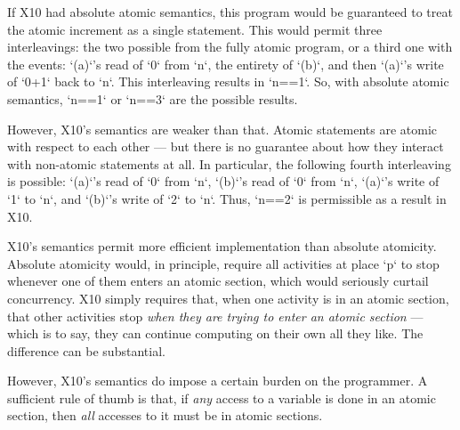 If X10 had absolute atomic semantics, this program would be guaranteed to
treat the atomic increment as a single statement.  This would permit three
interleavings: the two possible from the fully atomic program, or a third one
with the events:  \xcd`(a)`'s read of \xcd`0` from \xcd`n`, the entirety of
\xcd`(b)`, and then \xcd`(a)`'s write of \xcd`0+1` back to \xcd`n`.  This
interleaving results in \xcd`n==1`. So, with absolute atomic semantics,
\xcd`n==1` or \xcd`n==3` are the possible results.

However, X10's semantics are weaker than that.  Atomic statements are atomic
with respect to each other --- but there is no guarantee about how they
interact with non-atomic statements at all.  In particular, the following
fourth interleaving is possible: \xcd`(a)`'s read of \xcd`0` from \xcd`n`, 
\xcd`(b)`'s read of \xcd`0` from \xcd`n`, \xcd`(a)`'s write of \xcd`1` to
\xcd`n`, and \xcd`(b)`'s write of \xcd`2` to \xcd`n`.   Thus, \xcd`n==2` is
permissible as a result in X10.

X10's semantics permit more efficient implementation than absolute atomicity.
Absolute atomicity would, in principle, require all activities at place
\xcd`p` to stop whenever one of them enters an atomic section, which would
seriously curtail concurrency.  X10 simply requires that, when one activity is
in an atomic section, that other activities stop {\em when they are trying to
enter an atomic section} --- which is to say, they can continue computing on
their own all they like.  The difference can be substantial.

However, X10's semantics do impose a certain burden on the programmer.  A
sufficient rule of thumb is that, if {\em any} access to a
variable is done in an atomic section, then {\em all} accesses to it must be
in atomic sections.  
